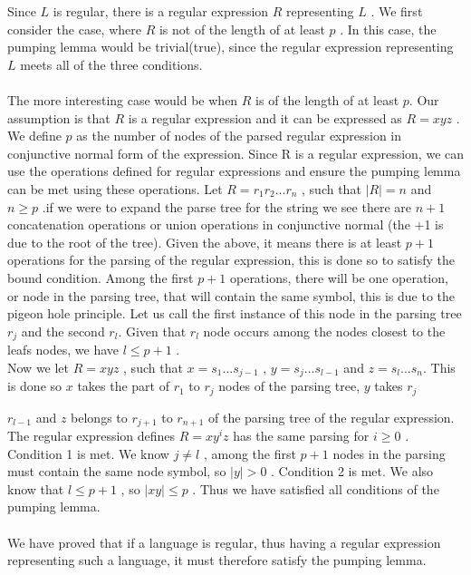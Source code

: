 \documentclass{report}
\newcommand{\me}[1]{
\begin{math}
#1
\end{math}
}
\begin{document}
Since \me{L} is regular, there is a regular expression \me{R} representing \me{L}. We first consider the case, where \me{R} is not of the length of at least \me{p}. In this case, the pumping lemma would be trivial(true), since the regular expression representing \me{L} meets all of the three conditions. 
\\ \\
 The more interesting case would be when \me{R} is of the length of at least \me{p.} Our assumption is that \me{R} is a regular expression and it can be expressed as \me{R = xyz}. We define \me{p} as the number of nodes of the parsed regular expression in conjunctive normal form of the expression. Since R is a regular expression, we can use the operations defined for regular expressions and ensure the pumping lemma can be met using these operations. Let \me{R = r_1r_2...r_n}, such that \me{|R| = n} and \me{n \geq p}.if we were to expand the parse tree for the string we see there are\me{n+1} concatenation operations or union operations in conjunctive normal (the +1 is due to the root of the tree). Given the above, it means there is at least \me{p+1} operations for the parsing of the regular expression, this is done so to satisfy the bound condition. Among the first \me{p+1} operations, there will be one operation, or node in the parsing  tree, that will contain the same symbol, this is due to the pigeon hole principle. Let us call the first instance of this node in the parsing tree \me{r_j} and the  second \me{r_l.} Given that \me{r_l} node occurs among the nodes closest to the leafs nodes, we have \me{l \leq p+1}. \\
 
 Now we let \me{R =xyz}, such that \me{x=s_1...s_{j-1}} , \me{y=s_j...s_{l-1}} and \me{z=s_l ...s_n.} This is done so\me{ x} takes the part of \me{r_1} to \me{r_j} nodes of the parsing tree, \me{y} takes \me{r_j} \me{r_{l-1}}and \me{z} belongs to \me{r_{j+1}} to \me{r_{n+1}}  of the parsing tree of the regular expression. The regular expression defines \me{R=xy^iz} has the same parsing for \me{i \geq 0}. Condition 1 is met. We know \me{j \neq l}, among the first \me{p+1} nodes in the parsing must contain the same node symbol, so \me{|y| > 0}. Condition 2 is met. We also know that \me{l \leq p+1}, so \me{|xy| \leq p}. Thus we have satisfied all conditions of the pumping lemma.  \\ \\
 
 We have proved that if a language is regular, thus having a regular expression representing such a language, it must therefore satisfy the pumping lemma. 
\ \ \\

	


\end{document}
